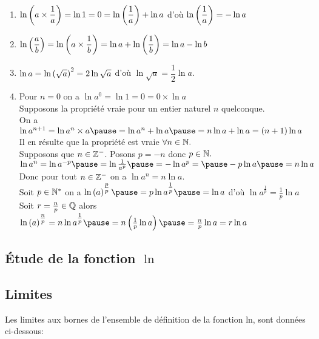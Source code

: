 \begin{enumerate}

\item $ \ln \left(a \times \dfrac{1}{a}\right)=\ln 1 =0 = \ln \left(\dfrac{1}{a}\right)+ \ln a  $ \; d'où   \;$\ln \left(\dfrac{1}{a}\right)= - \ln a$
\item $ \ln \left(\dfrac{a}{b} \right)= \ln \left( a\times \dfrac{1}{b} \right)=\ln a+ \ln \left( \dfrac{1}{b}\right)=\ln a-  \ln b $
\item $ \ln a=\ln \left(\sqrt{a}\right)^{2}=2\ln \sqrt{a} $\; d'où \;$ \ln \sqrt{a} = \dfrac{1}{2} \ln a$.
\item  Pour $ n=0 $\; on a $ \ln a^{0}=\ln 1 =0=0\times \ln a $ \pause\\ 
Supposons la propriété vraie pour un entier  naturel  $ n $ quelconque. \pause \\
On a $ \ln a^{n+1} =\ln a^{n}\times a \pause =\ln a^{n}+\ln a \pause = n\ln a+\ln a=(n+1)\ln a $ \pause \\
Il en résulte que la propriété est vraie $ \forall n \in \mathbb{N}. $ \pause\\
Supposons que $ n\in\mathbb{Z}^- $.\; \pause  Posons $ p=-n $  \pause  donc $ p\in\mathbb{N}. $ \pause \\
$ \ln a^{n}=\ln a^{-p} \pause  =\ln \frac{1}{a^{p}} \pause =-\ln a^{p}= \pause  -p\ln a \pause =n\ln a $ \pause \\
Donc pour tout $ n\in \mathbb{Z}^- $\; on a $\ln a^{n} = n\ln a  $.\pause \\
Soit  $ p\in \mathbb{N}^* $  on a $ \ln\paren{ a}^{\tfrac{p}{p}} \pause =             p\ln a^{\tfrac{1}{p}} \pause =\ln a $\;  \pause d'où   $ \ln a^{\tfrac{1}{p}}=\tfrac{1}{p} \ln a $  \pause  \\  Soit $ r=\tfrac{n}{p}\in\mathbb{Q} $\;   \pause  alors \; $ \ln \paren{a}^{\tfrac{n}{p}} =n \ln a^{\tfrac{1}{p}} \pause =n \paren{\tfrac{1}{p} \ln a} \pause =\tfrac{n}{p} \ln a=  r\ln a$ 
\end{enumerate}



\subsection{ Étude de la fonction $\ln $}

\subsection*{Limites}
 Les limites aux bornes de l'ensemble de définition  de  la fonction ln, sont données ci-dessous:


